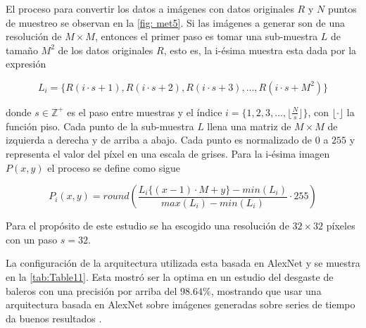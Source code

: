 El proceso para convertir los datos a imágenes con datos originales $R$ y $N$ puntos de muestreo se observan en la \autoref{fig: met5}.  Si las imágenes a generar son de una resolución de $M \times M$, entonces el primer paso es tomar una sub-muestra $L$ de tamaño $M^2$ de los datos originales $R$, esto es, la i-ésima muestra esta dada por la expresión 

\[ L_i = \{R(i\cdot s+1),R(i\cdot s+2),R(i\cdot s+3),...,R(i\cdot s+M^2)\} \]

donde $s\in \mathbb{Z}^+$ es el paso entre muestras y el índice $i = \{1,2,3,...,  \lfloor\frac{N}{s}\rfloor\}$, con $\lfloor \cdot \rfloor$ la función piso. Cada punto de la sub-muestra $L$ llena una matriz de $M\times M$ de izquierda a derecha y de arriba a abajo. Cada punto es normalizado de $0$ a $255$ y representa el valor del píxel en una escala de grises. Para la i-ésima imagen $P(x,y)$ el proceso se define como sigue

\[ P_i(x,y) =  round\left(\frac{L_i\{(x-1)\cdot M+y\}-min(L_i)}{max(L_i)-min(L_i)}\cdot 255\right)\]

Para el propósito de este estudio se ha escogido una resolución de $32\times 32$ píxeles con un paso $s = 32$.    

La configuración de la arquitectura utilizada esta basada en AlexNet y se muestra en la \autoref{tab:Table11}. Esta mostró ser la optima en un estudio del desgaste de baleros con una precisión por arriba del $98.64\%$, mostrando que usar una arquitectura basada en AlexNet sobre imágenes generadas sobre series de tiempo da buenos resultados \cite{pinedo-sanchezVibrationAnalysisBearings2020}. 

